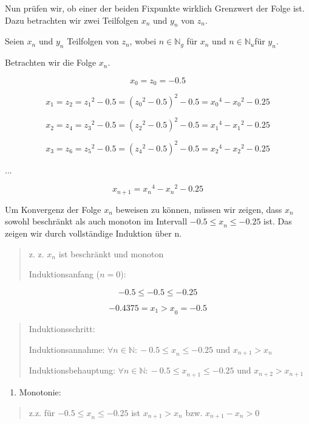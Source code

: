 \documentclass[a4paper, 12pt]{book}
\begin{document}
\begin{longtable}[]
\begin{minipage}[b]{\linewidth}
Nun prüfen wir, ob einer der beiden Fixpunkte wirklich Grenzwert der
Folge ist. Dazu betrachten wir zwei Teilfolgen \(x_{n}\) und \(y_{n}\)
von \(z_{n}\).

Seien \(x_{n}\) und \(y_{n}\) Teilfolgen von \(z_{n}\), wobei
\(n \in \mathbb{N}_{g}\) für \(x_{n}\) und
\(n \in \mathbb{N}_{u}\)für \(y_{n}\).

Betrachten wir die Folge \(x_{n}\).

\[x_{0} = z_{0} =  - 0.5\]

\[x_{1}{= z}_{2} = {z_{1}}^{2} - 0.5 = ({z_{0}}^{2} - 0.5)^{2} - 0.5 = {x_{0}}^{4} - {x_{0}}^{2} - 0.25\]

\[x_{2} = z_{4} = {z_{3}}^{2} - 0.5 = ({z_{2}}^{2} - 0.5)^{2} - 0.5 = {x_{1}}^{4} - {x_{1}}^{2} - 0.25\]

\[x_{3} = z_{6} = {z_{5}}^{2} - 0.5 = ({z_{4}}^{2} - 0.5)^{2} - 0.5 = {x_{2}}^{4} - {x_{2}}^{2} - 0.25\]

...

\[x_{n + 1} = {x_{n}}^{4} - {x_{n}}^{2} - 0.25\]

Um Konvergenz der Folge \(x_{n}\) beweisen zu können, müssen wir zeigen,
dass \(x_{n}\) sowohl beschränkt als auch monoton im Intervall
\(- 0.5{\leq x}_{n} \leq  - 0.25\) ist. Das zeigen wir durch
vollständige Induktion über n.

\begin{quote}
z. z. \(x_{n}\) ist beschränkt und monoton

Induktionsanfang (\(n = 0\)):
\end{quote}

\[- 0.5 \leq  - 0.5 \leq  - 0.25\]

\[{{- 0.4375 = x}_{1} > x}_{0} =  - 0.5\]

\begin{quote}
Induktionsschritt:

Induktionsannahme:
\(\forall n \in \mathbb{N:} - 0.5{\leq x}_{n} \leq  - 0.25\)
und \(x_{n + 1} > x_{n}\)

Induktionsbehauptung:
\(\forall n \in \mathbb{N:} - 0.5{\leq x}_{n + 1} \leq  - 0.25\)
und \(x_{n + 2} > x_{n + 1}\)
\end{quote}

\begin{enumerate}
\def\labelenumi{\arabic{enumi})}
\item
  Monotonie:
\end{enumerate}

\begin{quote}
z.z. für \(- 0.5{\leq x}_{n} \leq  - 0.25\) ist
\(x_{n + 1} > x_{n}\) bzw. \(x_{n + 1} - {x}_{n} > 0\)
\end{quote}


\end{minipage}
\end{longtable}
\end{document}
